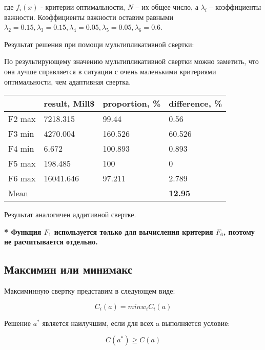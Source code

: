 \documentclass[14pt,a4paper,report]{report}
\begin{document}
где $f_i(x)$ - критерии оптимальности, $N$ – их общее число, а $\lambda_i$ -- коэффициенты важности. Коэффициенты важности оставим равными $\lambda_2=0.15, \lambda_3=0.15, \lambda_4=0.05, \lambda_5=0.05, \lambda_6=0.6$.



Результат решения при помощи мультипликативной свертки:



По результирующему значению мультипликативной свертки можно заметить, что она лучше справляется в ситуации с очень маленькими критериями оптимальности, чем адаптивная свертка.

\begin{table}[h!]
	\centering
	\bgroup
	\def\arraystretch{1}
	\begin{tabular}{ | m{1.2cm} | m{1.9cm} | m{2.2cm} | m{2.2cm} | }
		\hline
		& result, Mill\$ & proportion, \% & difference, \% \\ \hline
		F2 max & 7218.315 & 99.44 & 0.56 \\ \hline
		F3 min & 4270.004 & 160.526 & 60.526 \\ \hline
		F4 min & 6.672 & 100.893 & 0.893 \\ \hline
		F5 max & 198.485 & 100 & 0 \\ \hline
		F6 max & 16041.646 & 97.211 & 2.789 \\ \hline
		Mean & & & \textbf{12.95} \\
		\hline
	\end{tabular}
	\egroup
\end{table}

Результат аналогичен аддитивной свертке.

\textbf{* Функция $F_1$ используется только для вычисления критерия $F_6$, поэтому не расчитывается отдельно.}

\subsection{Максимин или минимакс}

Максиминную свертку представим в следующем виде:

\begin{equation*}
\text{$C_i(a)=min w_iC_i(a)$}
\end{equation*}

Решение $a^*$ является наилучшим, если для всех a выполняется условие:

\begin{equation*}
\text{$C(a^*)\geq C(a)$}
\end{equation*}
\end{document}
